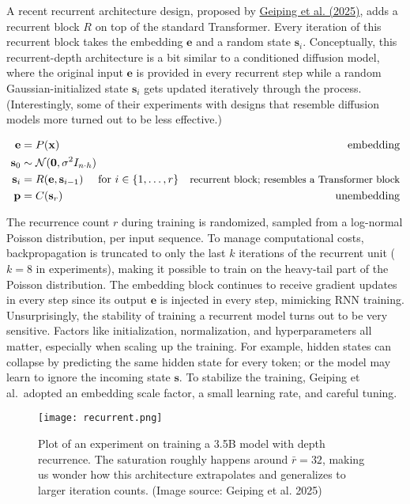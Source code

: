 \documentclass[12pt]{article}
\begin{document}
A recent recurrent architecture design, proposed by \href{https://arxiv.org/abs/2502.05171}{Geiping et al. (2025)}, adds a recurrent block $R$ on top of the standard Transformer. Every iteration of this recurrent block takes the embedding $\mathbf{e}$ and a random state $\mathbf{s}_i$. Conceptually, this recurrent-depth architecture is a bit similar to a conditioned diffusion model, where the original input $\mathbf{e}$ is provided in every recurrent step while a random Gaussian-initialized state $\mathbf{s}_i$ gets updated iteratively through the process. (Interestingly, some of their experiments with designs that resemble diffusion models more turned out to be less effective.)

\[
\begin{aligned}
\mathbf{e} &= P(\mathbf{x}) & \text{embedding} \\
\mathbf{s}_0 &\sim \mathcal{N}(\mathbf{0}, \sigma^2 I_{n \cdot h}) \\
\mathbf{s}_i &= R(\mathbf{e}, \mathbf{s}_{i-1}) \quad\text{ for }i \in \{1, \dots, r\} & \small{\text{recurrent block; resembles a Transformer block}}\\
\mathbf{p} &= C(\mathbf{s}_r) & \text{unembedding}
\end{aligned}
\]

The recurrence count $r$ during training is randomized, sampled from a log-normal Poisson distribution, per input sequence. To manage computational costs, backpropagation is truncated to only the last $k$ iterations of the recurrent unit ($k=8$ in experiments), making it possible to train on the heavy-tail part of the Poisson distribution. The embedding block continues to receive gradient updates in every step since its output $\mathbf{e}$ is injected in every step, mimicking RNN training. Unsurprisingly, the stability of training a recurrent model turns out to be very sensitive. Factors like initialization, normalization, and hyperparameters all matter, especially when scaling up the training. For example, hidden states can collapse by predicting the same hidden state for every token; or the model may learn to ignore the incoming state $\mathbf{s}$. To stabilize the training, Geiping et al.\ adopted an embedding scale factor, a small learning rate, and careful tuning.

\begin{figure}[h]
    \centering
    \texttt{[image: recurrent.png]}
    \caption{Plot of an experiment on training a 3.5B model with depth recurrence. The saturation roughly happens around $\bar{r} = 32$, making us wonder how this architecture extrapolates and generalizes to larger iteration counts. (Image source: Geiping et al. 2025)}
\end{figure}
\end{document}
